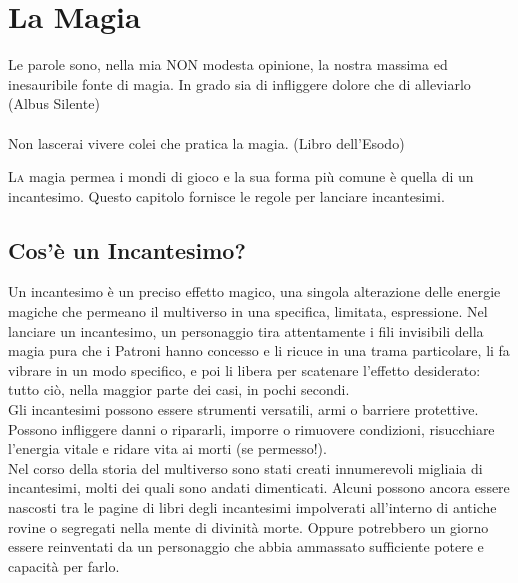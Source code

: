 \section{La Magia}


\label{la-magia}
\begin{tcolorbox}[enhanced,arc=5pt,boxrule=0.3pt]{
Le parole sono, nella mia NON modesta opinione, la nostra massima ed inesauribile fonte di magia. In grado sia di infliggere dolore che di alleviarlo (Albus Silente)\\\\
Non lascerai vivere colei che pratica la magia. (Libro dell'Esodo)} \end{tcolorbox} \medskip


\begin{multicols}{2}

\lettrine{L}{a} magia permea i mondi di gioco e la sua forma più comune è quella di un incantesimo. Questo capitolo fornisce le regole per lanciare incantesimi. \\

\medskip

\subsection{Cos'è un Incantesimo?}

Un incantesimo è un preciso effetto magico, una singola alterazione delle energie magiche che permeano il multiverso in una specifica, limitata, espressione. Nel lanciare un incantesimo, un personaggio tira attentamente i fili invisibili della magia pura che i Patroni hanno concesso e li ricuce in una trama particolare, li fa vibrare in un modo specifico, e poi li libera per scatenare l'effetto desiderato: tutto ciò, nella maggior parte dei casi, in pochi secondi.\\

Gli incantesimi possono essere strumenti versatili, armi o barriere protettive. Possono infliggere danni o ripararli, imporre o rimuovere condizioni, risucchiare l'energia vitale e ridare vita ai morti (se permesso!).\\

Nel corso della storia del multiverso sono stati creati innumerevoli migliaia di incantesimi, molti dei quali sono andati dimenticati. Alcuni possono ancora essere nascosti tra le pagine di libri degli incantesimi impolverati all'interno di antiche rovine o segregati nella mente di divinità morte. Oppure potrebbero un giorno essere reinventati da un personaggio che abbia ammassato sufficiente potere e capacità per farlo.\\


\end{multicols}
